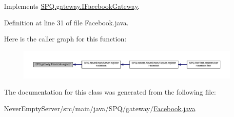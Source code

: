 Implements \mbox{\hyperlink{interface_s_p_q_1_1gateway_1_1_i_facebook_gateway_adeef42315d68dc80ddf79bf4e1cbdeb0}{S\+P\+Q.\+gateway.\+I\+Facebook\+Gateway}}.



Definition at line 31 of file Facebook.\+java.

Here is the caller graph for this function\+:
\nopagebreak
\begin{figure}[H]
\begin{center}
\leavevmode
\includegraphics[width=350pt]{class_s_p_q_1_1gateway_1_1_facebook_aba03bc89c530d3f2159b3a1eb65c3427_icgraph}
\end{center}
\end{figure}


The documentation for this class was generated from the following file\+:\begin{DoxyCompactItemize}
\item 
Never\+Empty\+Server/src/main/java/\+S\+P\+Q/gateway/\mbox{\hyperlink{_facebook_8java}{Facebook.\+java}}\end{DoxyCompactItemize}
